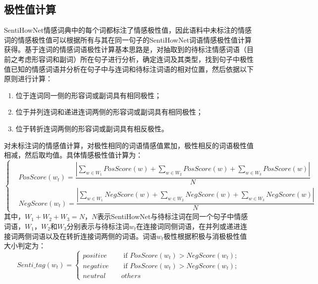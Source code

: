 \subsection{极性值计算}
SentiHowNet情感词典中的每个词都标注了情感极性值，因此语料中未标注的情感词的情感极性值可以根据所有与其在同一句子的SentiHowNet词语情感极性值计算获得。基于连词的情感词语极性计算基本思路是，对抽取到的待标注情感词语（目前之考虑形容词和副词）所在句子进行分析，确定连词及其类型，找到句子中极性值已知的情感词语并分析在句子中与连词和待标注词语的相对位置，然后依据以下原则进行计算：
\begin{enumerate}
\item 位于连词同一侧的形容词或副词具有相同极性；
\item 位于并列连词和递进连词两侧的形容词或副词具有相同极性；
\item 位于转折连词两侧的形容词或副词具有相反极性。
\end{enumerate}
对未标注词的情感值计算，对极性相同的词语情感值累加，极性相反的词语极性值相减，然后取均值。具体情感极性值计算为：
\begin{equation}
\begin{cases}
& PosScore(w_t)=\dfrac{|\sum_{w \in W_1}PosScore(w)+\sum_{w \in W_2}PosScore(w)+\sum_{w \in W_3}PosScore(w)|}{N} \\
& NegScore(w_t)=\dfrac{|\sum_{w \in W_1}NegScore(w)+\sum_{w \in W_2}NegScore(w)+\sum_{w \in W_3}NegScore(w)|}{N}
\end{cases}
\end{equation}
其中，$W_1+W_2+W_3=N$，$N$表示SentiHowNet与待标注词在同一个句子中情感词语，$W_1$，$W_2$和$W_3$分别表示与待标注词$w_t$在连接词同侧词语，在并列或递进连接词两侧词语以及在转折连接词两侧的词语。词语$w_t$极性根据积极与消极极性值大小判定为：
\begin{equation}
\label{eq3-2}
Senti\_tag(w_t)=
\begin{cases}
 positive \quad & \text{ if } PosScore(w_t)> NegScore(w_t); \\ 
 negative \quad &\text{ if } PosScore(w_t)> NegScore(w_t);  \\ 
 neutral  \quad & others
\end{cases}
\end{equation}

